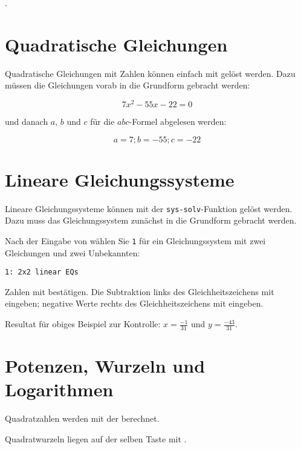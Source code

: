.
\newpage


\section{Quadratische Gleichungen}\label{quadGL}
Quadratische Gleichungen mit Zahlen können einfach mit  gelöst werden. Dazu müssen die Gleichungen vorab in die Grundform gebracht werden:

$$7x^2 - 55x - 22 = 0$$

und danach $a$, $b$ und $c$ für die $abc$-Formel abgelesen werden:

$$a=7; b=-55; c=-22$$


\section{Lineare Gleichungssysteme}\label{gleichungssysteme}
Lineare Gleichungssysteme können mit der \texttt{sys-solv}-Funktion gelöst werden.
Dazu muss das Gleichungssystem zunächst in die Grundform gebracht werden.


Nach der Eingabe von  wählen Sie \texttt{1} für ein Gleichungssystem mit zwei Gleichungen und zwei Unbekannten:

\texttt{1: 2x2 linear EQs}

Zahlen mit  bestätigen. Die Subtraktion links des
Gleichheitszeichens mit  eingeben; negative Werte rechts
des Gleichheitszeichens mit  eingeben.

Resultat für obiges Beispiel zur Kontrolle: $x=\frac{-1}{31}$ und $y=\frac{-43}{31}$.
\newpage


\section{Potenzen, Wurzeln und
Logarithmen}\label{ln_log}\label{xhoch_nwurz}

Quadratzahlen werden mit der  berechnet.

Quadratwurzeln liegen auf der selben Taste
mit  .


